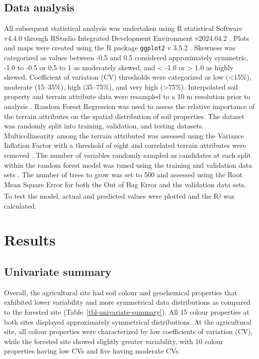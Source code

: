 \documentclass[
  number]{elsarticle}
\begin{document}
\subsection{Data analysis}\label{data-analysis}

All subsequent statistical analysis was undertaken using R statistical
Software v4.4.0 \citep{rcoreteam2024} through RStudio Integrated
Development Environment v2024.04.2 \citep{rstudio2024}. Plots and maps
were created using the R package \texttt{ggplot2} v 3.5.2
\citep{wickham2016}. Skewness was categorized as values between -0.5 and
0.5 considered approximately symmetric, -1.0 to -0.5 or 0.5 to 1 as
moderately skewed, and \textless{} -1.0 or \textgreater{} 1.0 as highly
skewed. Coefficient of variation (CV) thresholds were categorized as low
(\textless15\%), moderate (15--35\%), high (35--75\%), and very high
(\textgreater75\%). Interpolated soil property and terrain attribute
data were resampled to a 10 m resolution prior to analysis
\citep[\texttt{terra} v1.8.42][]{hijmans2024}. Random Forest Regression
\citep[\texttt{randomForest} v4.7.1.2][]{liaw2002} was used to assess
the relative importance of the terrain attributes on the spatial
distribution of soil properties. The dataset was randomly split into
training, validation, and testing datasets. Multicollinearity among the
terrain attributed was assessed using the Variance Inflation Factor with
a threshold of eight and correlated terrain attributes were removed
\citep[\texttt{usdm} v2.1.7][]{Naimi2014}. The number of variables
randomly sampled as candidates at each split within the random forest
model was tuned using the training and validation data sets
\citep[\texttt{caret} v7.0.1][]{kuhn2008}. The number of trees to grow
was set to 500 and assessed using the Root Mean Square Error for both
the Out of Bag Error and the validation data sets. To test the model,
actual and predicted values were plotted and the
R\textsuperscript{\textsubscript{2}} was calculated.

\section{Results}\label{results}

\subsection{Univariate summary}\label{univariate-summary}

Overall, the agricultural site had soil colour and geochemical
properties that exhibited lower variability and more symmetrical data
distributions as compared to the forested site
(Table~\ref{tbl-univariate-summary}). All 15 colour properties at both
sites displayed approximately symmetrical distributions. At the
agricultural site, all colour properties were characterized by low
coefficients of variation (CV), while the forested site showed slightly
greater variability, with 10 colour properties having low CVs and five
having moderate CVs.
\end{document}
